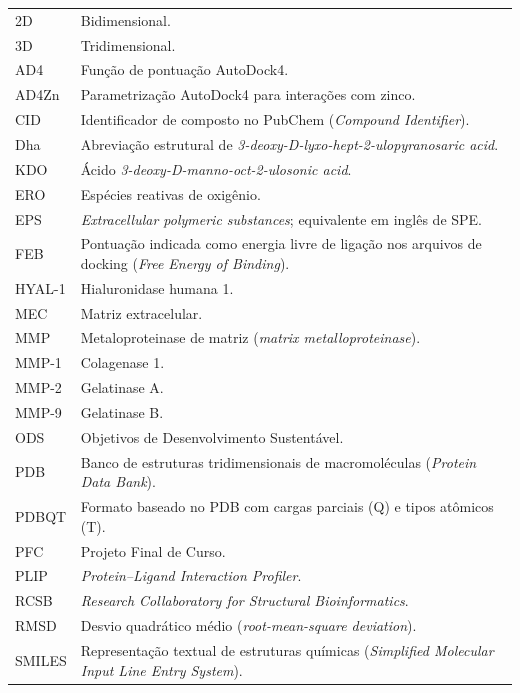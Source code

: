 \begingroup
\setlength{\tabcolsep}{0pt}
\renewcommand{\arraystretch}{1.0}
\begin{longtable}{@{}p{2.0cm}@{\hspace{0.5cm}}p{13.0cm}@{}}
2D & Bidimensional.\\
3D & Tridimensional.\\
AD4 & Função de pontuação AutoDock4.\\
AD4Zn & Parametrização AutoDock4 para interações com zinco.\\
CID & Identificador de composto no PubChem (\textit{Compound Identifier}).\\
Dha & Abreviação estrutural de \textit{3-deoxy-D-lyxo-hept-2-ulopyranosaric acid}.\\
KDO & Ácido \textit{3-deoxy-D-manno-oct-2-ulosonic acid}.\\
ERO & Espécies reativas de oxigênio.\\
EPS & \textit{Extracellular polymeric substances}; equivalente em inglês de SPE.\\
FEB & Pontuação indicada como energia livre de ligação nos arquivos de docking (\textit{Free Energy of Binding}).\\
HYAL-1 & Hialuronidase humana 1.\\
MEC & Matriz extracelular.\\
MMP & Metaloproteinase de matriz (\textit{matrix metalloproteinase}).\\
MMP-1 & Colagenase 1.\\
MMP-2 & Gelatinase A.\\
MMP-9 & Gelatinase B.\\
ODS & Objetivos de Desenvolvimento Sustentável.\\
PDB & Banco de estruturas tridimensionais de macromoléculas (\textit{Protein Data Bank}).\\
PDBQT & Formato baseado no PDB com cargas parciais (Q) e tipos atômicos (T).\\
PFC & Projeto Final de Curso.\\
PLIP & \textit{Protein--Ligand Interaction Profiler}.\\
RCSB & \textit{Research Collaboratory for Structural Bioinformatics}.\\
RMSD & Desvio quadrático médio (\textit{root-mean-square deviation}).\\
SMILES & Representação textual de estruturas químicas (\textit{Simplified Molecular Input Line Entry System}).\\

\end{longtable}
